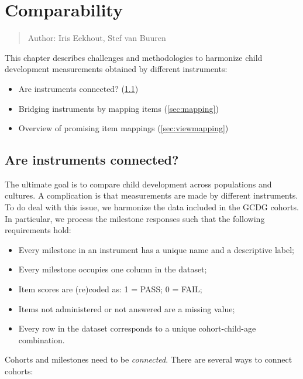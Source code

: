 \documentclass[
]{book}
\providecommand{\tightlist}{%
  \setlength{\itemsep}{0pt}\setlength{\parskip}{0pt}}
\begin{document}
\hypertarget{ch:comparability}{%
\chapter{Comparability}\label{ch:comparability}}

\begin{quote}
Author: Iris Eekhout, Stef van Buuren
\end{quote}

This chapter describes challenges and methodologies to harmonize child development measurements obtained by different instruments:

\begin{itemize}
\tightlist
\item
  Are instruments connected? (\ref{sec:challenge})
\item
  Bridging instruments by mapping items (\ref{sec:mapping})
\item
  Overview of promising item mappings (\ref{sec:viewmapping})
\end{itemize}

\hypertarget{sec:challenge}{%
\section{Are instruments connected?}\label{sec:challenge}}

The ultimate goal is to compare child development across populations and cultures. A complication is that measurements are made by different instruments. To do deal with this issue, we harmonize the data included in the GCDG cohorts. In particular, we process the milestone responses such that the following requirements hold:

\begin{itemize}
\tightlist
\item
  Every milestone in an instrument has a unique name and a descriptive label;
\item
  Every milestone occupies one column in the dataset;
\item
  Item scores are (re)coded as: 1 = PASS; 0 = FAIL;
\item
  Items not administered or not answered are a missing value;
\item
  Every row in the dataset corresponds to a unique cohort-child-age combination.
\end{itemize}

Cohorts and milestones need to be \emph{connected}. There are several ways to connect cohorts:
\end{document}
